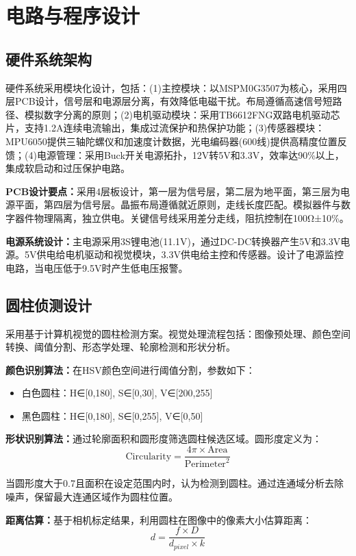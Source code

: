\documentclass[UTF8]{ctexart}
\begin{document}
	\section{电路与程序设计}
	
	\subsection{硬件系统架构}
	硬件系统采用模块化设计，包括：(1)主控模块：以MSPM0G3507为核心，采用四层PCB设计，信号层和电源层分离，有效降低电磁干扰。布局遵循高速信号短路径、模拟数字分离的原则；(2)电机驱动模块：采用TB6612FNG双路电机驱动芯片，支持1.2A连续电流输出，集成过流保护和热保护功能；(3)传感器模块：MPU6050提供三轴陀螺仪和加速度计数据，光电编码器(600线)提供高精度位置反馈；(4)电源管理：采用Buck开关电源拓扑，12V转5V和3.3V，效率达90\%以上，集成软启动和过压保护电路。
	
	\textbf{PCB设计要点：}采用4层板设计，第一层为信号层，第二层为地平面，第三层为电源平面，第四层为信号层。晶振布局遵循就近原则，走线长度匹配。模拟器件与数字器件物理隔离，独立供电。关键信号线采用差分走线，阻抗控制在100Ω±10\%。
	
	\textbf{电源系统设计：}主电源采用3S锂电池(11.1V)，通过DC-DC转换器产生5V和3.3V电源。5V供电给电机驱动和视觉模块，3.3V供电给主控和传感器。设计了电源监控电路，当电压低于9.5V时产生低电压报警。
	
	\subsection{圆柱侦测设计}
	采用基于计算机视觉的圆柱检测方案。视觉处理流程包括：图像预处理、颜色空间转换、阈值分割、形态学处理、轮廓检测和形状分析。
	
	\textbf{颜色识别算法：}在HSV颜色空间进行阈值分割，参数如下：
	\begin{itemize}
		\item 白色圆柱：H∈[0,180], S∈[0,30], V∈[200,255]
		\item 黑色圆柱：H∈[0,180], S∈[0,255], V∈[0,50]
	\end{itemize}
	
	\textbf{形状识别算法：}通过轮廓面积和圆形度筛选圆柱候选区域。圆形度定义为：
	$$\text{Circularity} = \frac{4\pi \times \text{Area}}{\text{Perimeter}^2}$$
	
	当圆形度大于0.7且面积在设定范围内时，认为检测到圆柱。通过连通域分析去除噪声，保留最大连通区域作为圆柱位置。
	
	\textbf{距离估算：}基于相机标定结果，利用圆柱在图像中的像素大小估算距离：
	$$d = \frac{f \times D}{d_{pixel} \times k}$$
	
\end{document}
